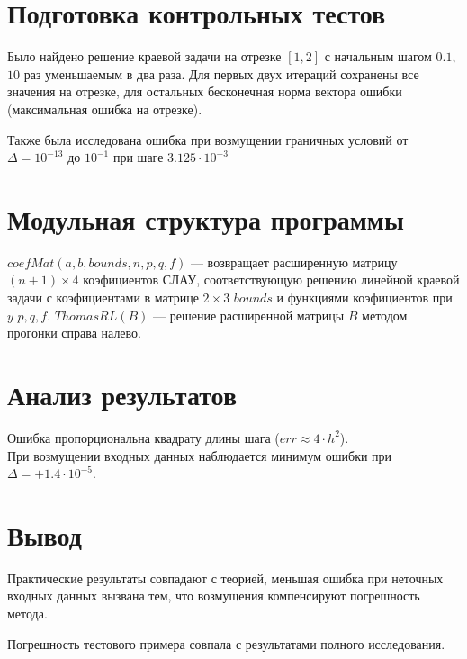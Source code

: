 \documentclass[a4paper]{article}
\begin{document}
\section{Подготовка контрольных тестов}\label{sec:S6}
Было найдено решение краевой задачи на отрезке \([1,2]\) с начальным шагом \(0.1\), \(10\) раз уменьшаемым в два раза.
Для первых двух итераций сохранены все значения на отрезке, для остальных бесконечная норма вектора ошибки (максимальная
ошибка на отрезке).

Также была исследована ошибка при возмущении граничных условий от \(\Delta = 10^{-13}\) до \(10^{-1}\) при шаге \(3.125\cdot10^{-3}\)
\section{Модульная структура программы}\label{sec:S7}
\(coefMat(a,b,bounds,n,p,q,f)\) --- возвращает расширенную матрицу \((n+1) \times 4\) коэфициентов СЛАУ, соответствующую
решению линейной краевой задачи с коэфициентами в матрице \(2 \times 3\) \(bounds\) и функциями коэфициентов при \(y\) \(p,q,f\).
\(ThomasRL(B)\) --- решение расширенной матрицы \(B\) методом прогонки справа налево.
\section{Анализ результатов}\label{sec:S8}
Ошибка пропорциональна квадрату длины шага (\(err \approx 4\cdot h^{2}\)).\\
При возмущении входных данных наблюдается минимум ошибки при \(\Delta = +1.4\cdot10^{-5}\).

\section{Вывод}\label{sec:S9}
Практические результаты совпадают с теорией, меньшая ошибка при неточных входных данных вызвана тем, что возмущения
компенсируют погрешность метода.

Погрешность тестового примера совпала с результатами полного исследования.
\end{document}
